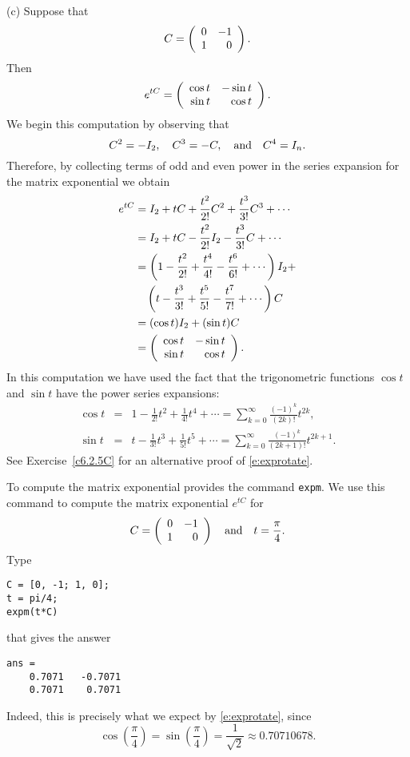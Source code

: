 \documentclass{ximera}
\begin{document}
\noindent (c) \quad Suppose that
     \[
                C = \left(\begin{array}{rr} 0 & -1\\ 1 &0\end{array}\right).
      \]
Then
\begin{equation} \label{e:exprotate}
e^{tC} = \left(\begin{array}{rr} \cos t & -\sin t\\ \sin t &\cos t\end{array}\right).
\end{equation}
We begin this computation by observing that
\[
C^2 = -I_2, \quad C^3 = -C, \quad\mbox{and}\quad C^4 = I_n.
\]
Therefore, by collecting terms of odd and even power in the series
expansion for the matrix exponential we obtain
\begin{align*}
e^{tC} & =  I_2 + tC + \frac{t^2}{2!} C^2 +  \frac{t^3}{3!}C^3 +\cdots\\
     & =  I_2 + tC - \frac{t^2}{2!}I_2 - \frac{t^3}{3!}C +\cdots\\
     & =  \left(1 - \frac{t^2}{2!} + \frac{t^4}{4!} - \frac{t^6}{6!} +
		\cdots \right)I_2 + \\
	 &\quad \left(t - \frac{t^3}{3!} + \frac{t^5}{5!} - \frac{t^7}{7!} +
	\cdots \right)C \\
     & =  (\cos t)I_2 + (\sin t)C \\
     & =  \left(\begin{array}{rr} \cos t & -\sin t\\ \sin t &\cos t\end{array}\right).
     \end{align*}
In this computation we have used the fact that the trigonometric
functions $\cos t$ and $\sin t$ have the power series expansions:
\begin{eqnarray*}
\cos t & = & 1-\frac{1}{2!}t^2+\frac{1}{4!} t^4 + \cdots =
\sum\limits_{k=0}^\infty\frac{(-1)^k}{(2k)!} t^{2k},\\
\sin t & = & t-\frac{1}{3!} t^3 + \frac{1}{5!} t^5 + \cdots
   = \sum\limits_{k=0}^\infty \frac{(-1)^k}{(2k+1)!} t^{2k+1}.
\end{eqnarray*}
See Exercise~\ref{c6.2.5C} for an alternative proof of \eqref{e:exprotate}.

To compute the matrix exponential
\Matlab{} provides the command
{\tt expm}.  We use this command to compute
the matrix exponential $e^{tC}$ for
\[
C=\left(\begin{array}{rr} 0 & -1\\ 1 &0\end{array}\right) \quad\mbox{and}\quad t=\frac{\pi}{4}.
\]
Type
\begin{verbatim}
C = [0, -1; 1, 0];
t = pi/4;
expm(t*C)
\end{verbatim}
that gives the answer
\begin{verbatim}
ans =
    0.7071   -0.7071
    0.7071    0.7071
\end{verbatim}
Indeed, this is precisely what we expect by \eqref{e:exprotate},
since
\[
\cos\left(\frac{\pi}{4}\right)=\sin\left(\frac{\pi}{4}\right)=
\frac{1}{\sqrt{2}}\approx 0.70710678.
\]
\end{document}
